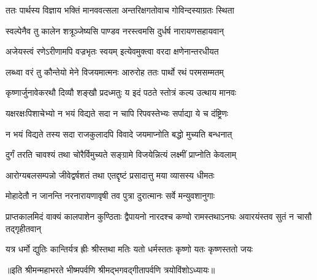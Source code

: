 
\twolineshloka
{ततः पार्थस्य विज्ञाय भक्तिं मानववत्सला}
{अन्तरिक्षगतोवाच गोविन्दस्याग्रतः स्थिता}


\twolineshloka
{स्वल्पेनैव तु कालेन शत्रूञ्जेष्यसि पाण्डव}
{नरस्त्वमसि दुर्धर्ष नारायणसहायवान्}

\twolineshloka
{अजेयस्त्वं रणेऽरीणामपि वज्रभृतः स्वयम्}
{इत्येवमुक्त्वा वरदा क्षणेनान्तरधीयत}

\twolineshloka
{लब्ध्वा वरं तु कौन्तेयो मेने विजयमात्मनः}
{आरुरोह ततः पार्थो रथं परमसम्मतम्}

\twolineshloka
{कृष्णार्जुनावेकरथौ दिव्यौ शङ्खौ प्रदध्मतुः}
{य इदं पठते स्तोत्रं कल्य उत्थाय मानवः}

\twolineshloka
{यक्षरक्षःपिशाचेभ्यो न भयं विद्यते सदा}
{न चापि रिपवस्तेभ्यः सर्पाद्या ये च दंष्ट्रिणः}

\twolineshloka
{न भयं विद्यते तस्य सदा राजकुलादपि}
{विवादे जयमाप्नोति बद्धो मुच्यति बन्धनात्}

\twolineshloka
{दुर्गं तरति चावश्यं तथा चोरैर्विमुच्यते}
{सङ्ग्रामे विजयेन्नित्यं लक्ष्मीं प्राप्नोति केवलाम्}

\twolineshloka
{आरोग्यबलसम्पन्नो जीवेद्वर्षशतं तथा}
{एतद्दृष्टं प्रसादात्तु मया व्यासस्य धीमतः}

\twolineshloka
{मोहादेतौ न जानन्ति नरनारायणावृषी}
{तव पुत्रा दुरात्मानः सर्वे मन्युवशानुगाः}


\threelineshloka
{प्राप्तकालमिदं वाक्यं कालपाशेन कुण्ठिताः}
{द्वैपायनो नारदश्च कण्वो रामस्तथाऽनघः}
{अवारयंस्तव सुतं न चासौ तद्गृहीतवान्}

\twolineshloka
{यत्र धर्मो द्युतिः कान्तिर्यत्र ह्रीः श्रीस्तथा मतिः}
{यतो धर्मस्ततः कृष्णो यतः कृष्णस्ततो जयः}

॥इति श्रीमन्महाभरते भीष्मपर्वणि श्रीमद्भगवद्गीतापर्वणि
त्रयोविंशोऽध्यायः॥
